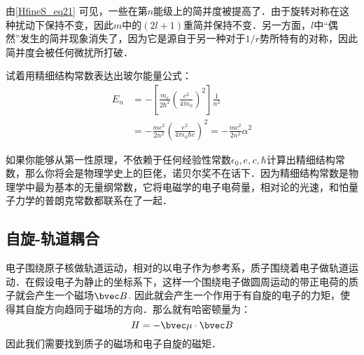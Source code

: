 由\autoref{HfineS_eq21} 可见，一些在第$n$能级上的简并度被提高了．由于旋转对称在这种扰动下保持不变，因此$m$中的$(2l+1)$重简并保持不变．另一方面，$l$中“偶然”发生的简并现象消失了，因为它是源自于另一种对于$1/r$势所特有的对称，因此简并度会被任何微扰所打破．
\begin{example}{}
试着用精细结构常数表达出玻尔能量公式：
\begin{align}
E_n&=-\left[\frac {m_e}{2\hbar^{2}} \left(\frac {e^ {2}}{4\pi \epsilon_0}\right)^ {2}\right]  \frac {1}{n^2}\\
&=-\frac{mc^2}{2n^2}\left(\frac {e^{2}}{4\pi \epsilon_0\hbar c}\right)^2=-\frac{mc^2}{2n^2}\alpha^2
\end{align}
\end{example}

如果你能够从第一性原理，不依赖于任何经验性常数$\epsilon_0,e,c,\hbar$计算出精细结构常数，那么你将会是物理学史上的巨佬，诺贝尔奖不在话下．因为精细结构常数是物理学中最为基本的无量纲常数，它将电磁学的电子电荷量，相对论的光速，和怕量子力学的普朗克常数都联系在了一起．
\subsection{自旋-轨道耦合}
电子围绕原子核做轨道运动，相对的以电子作为参考系，质子围绕着电子做轨道运动．在假设电子为静止的坐标系下，这样一个围绕电子做圆周运动的带正电荷的质子就会产生一个磁场$\bvec B$. 因此就会产生一个作用于有自旋的电子的力矩，使得其自旋方向趋同于磁场的方向．那么就有哈密顿量为：
\begin{equation}
H=-\bvec\mu \cdot \bvec B
\end{equation}
因此我们需要找到质子的磁场和电子自旋的磁矩．

